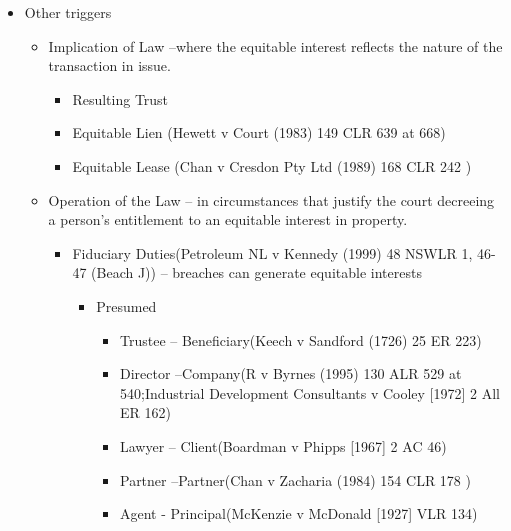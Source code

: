 \begin{itemize}
\begin{itemize}
\begin{itemize}
                \end{itemize}
        \end{itemize}
    \item Other triggers
        \begin{itemize}
            \item Implication of Law --where the equitable interest reflects the nature of the transaction in issue. 
                \begin{itemize}
                    \item Resulting Trust
                    \item Equitable Lien (Hewett v Court (1983) 149 CLR 639 at 668)
                    \item Equitable Lease (Chan v Cresdon Pty Ltd (1989) 168 CLR 242 )
                \end{itemize}
            \item Operation of the Law -- in circumstances that justify the court decreeing a person’s entitlement to an equitable interest in property. 
                \begin{itemize}
                    \item Fiduciary Duties(Petroleum NL v Kennedy (1999) 48 NSWLR 1, 46-47 (Beach J)) -- breaches can generate equitable interests
                        \begin{itemize}
                            \item Presumed
                                \begin{itemize}
                                    \item Trustee -- Beneficiary(Keech v Sandford (1726) 25 ER 223)
                                    \item Director --Company(R v Byrnes (1995) 130 ALR 529 at 540;Industrial Development Consultants v Cooley [1972] 2 All ER 162)
                                    \item Lawyer -- Client(Boardman v Phipps [1967] 2 AC 46)
                                    \item Partner --Partner(Chan v Zacharia (1984) 154 CLR 178 )
                                    \item Agent - Principal(McKenzie v McDonald [1927] VLR 134)
                                \end{itemize}


\end{itemize}
\end{itemize}
\end{itemize}
\end{itemize}
